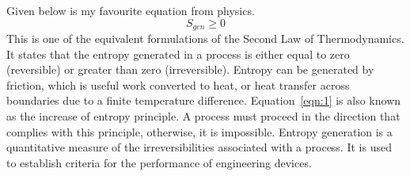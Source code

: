 Given below is my favourite equation from physics.
\begin{equation}
S_{gen} \geq 0
\label{eqn:1}
\end{equation}
This is one of the equivalent formulations of the Second Law of Thermodynamics. It states that the entropy generated in a process is either equal to zero (reversible) or greater than zero (irreversible). Entropy can be generated by friction, which is useful work converted to heat, or heat transfer across boundaries due to a finite temperature difference. Equation~\ref{eqn:1} is also known as the increase of entropy principle. A process must proceed in the direction that complies with this principle, otherwise, it is impossible. Entropy generation is a quantitative measure of the irreversibilities associated with a process. It is used to establish criteria for the performance of engineering devices.
